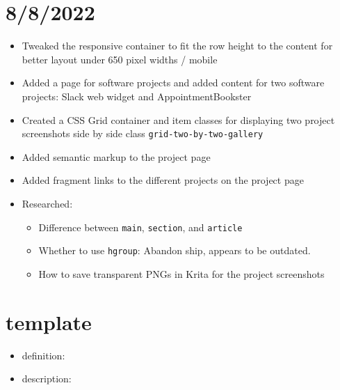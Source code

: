 \documentclass{article}
\begin{document}
\section*{8/8/2022}
\begin{itemize}
	\item Tweaked the responsive container to fit the row height to the content for better layout under 650 pixel widths / mobile
	\item Added a page for software projects and added content for two software projects: Slack web widget and AppointmentBookster
	\item Created a CSS Grid container and item classes for displaying two project screenshots side by side class \texttt{grid-two-by-two-gallery}
	\item Added semantic markup to the project page
	\item Added fragment links to the different projects on the project page
	\item Researched:
		\begin{itemize} 
	 			\item Difference between  \texttt{main},  \texttt{section}, and  \texttt{article}
	 			\item Whether to use \texttt{hgroup}: Abandon ship, appears to be outdated.
				\item How to save transparent PNGs in Krita for the project screenshots
		\end{itemize}
\end{itemize}

\section*{template}
	
\begin{itemize}
	\item definition:
	\item description:
\end{itemize}


















































	
\end{document}
